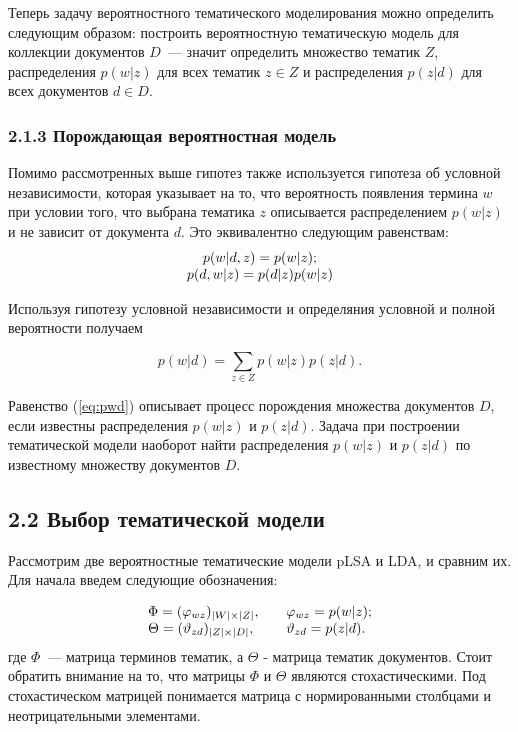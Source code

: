 \documentclass[a4paper]{report}
\begin{document}
	Теперь задачу вероятностного тематического моделирования можно определить следующим образом: построить вероятностную тематическую модель для коллекции документов $D$~--- значит определить множество тематик $Z$, распределения $p(w|z)$ для всех тематик $z \in Z$ и распределения $p(z|d)$ для всех документов $d \in D$.
	
	\subsubsection{2.1.3 Порождающая вероятностная модель}

	Помимо рассмотренных выше гипотез также используется гипотеза об условной независимости, которая указывает на то, что вероятность появления термина $w$ при	условии того, что выбрана тематика $z$ описывается распределением $p(w|z)$ и не зависит от документа $d$. Это эквивалентно следующим равенствам:
	\begin{equation}
		\begin{array}{c c}
			p(w|d,z) = p(w|z); \\
			p(d,w|z) = p(d|z)p(w|z)
		\end{array}
	\end{equation}

	Используя гипотезу условной независимости и определяния условной и полной вероятности получаем
	
	\begin{equation}
		p(w|d) = \sum_{z \in Z} p(w|z)p(z|d).
	\label{eq:pwd}
	\end{equation}
	
	Равенство (\ref{eq:pwd}) описывает процесс порождения множества документов $D$, если известны распределения $p(w|z)$ и  $p(z|d)$. Задача при построении тематической модели наоборот найти распределения $p(w|z)$ и  $p(z|d)$ по известному множеству документов $D$.
	
	\subsection{2.2 Выбор тематической модели}
	
	Рассмотрим две вероятностные тематические модели pLSA и LDA, и сравним их. 
	Для начала введем следующие обозначения:
	
	\begin{equation}
		\begin{array}{l l}
			
			\Phi = (\varphi_{wz})_{|W| \times |Z|}, & \quad
				\varphi_{wz} = p(w|z); \\
			\Theta = (\vartheta_{zd})_{|Z| \times |D|}, & \quad
				\vartheta_{zd} = p(z|d).
		\end{array}
		\label{eq:desc}
	\end{equation}
	где $\Phi$~--- матрица терминов тематик, а $\Theta$ - матрица тематик документов. Стоит обратить внимание на то, что матрицы $\Phi$ и $\Theta$ являются стохастическими. Под стохастическом матрицей понимается матрица с нормированными столбцами и неотрицательными элементами.
	
\end{document}
